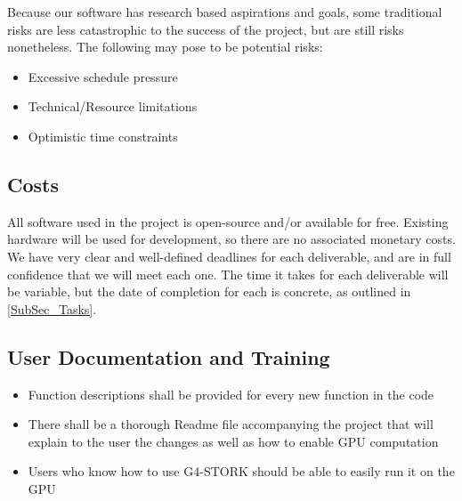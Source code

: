 \documentclass[12pt]{article}
\newcommand{\todo}[1]{\textcolor{red}{[TODO: #1]}} \else
\newcommand{\authornote}[3]{} \newcommand{\todo}[1]{} \fi
\newcommand{\ds}[1]{\authornote{blue}{DS}{#1}} %
\newcommand{\mmp}[1]{\authornote{green}{MP}{#1}}
\begin{document}
Because our software has research based aspirations and goals, some traditional risks are less catastrophic to the success of the project, but are still risks nonetheless. The following may pose to be potential risks:\\

\begin{itemize}
	\item Excessive schedule pressure
	\item Technical/Resource limitations
	\ds{What do you mean by this?}\mmp{commented out the inadequate measurements item}
	\item Optimistic time constraints
\end{itemize}

\subsection{Costs} %
All software used in the project is open-source and/or available for free. Existing hardware will be used for development, so there are no associated monetary costs.\\

We have very clear and well-defined deadlines for each deliverable, and are in full confidence that we will meet each one. The time it takes for each deliverable will be variable, but the date of completion for each is concrete, as outlined in \ref{SubSec_Tasks}.

\subsection{User Documentation and Training} %
\begin{itemize}
	\item Function descriptions shall be provided for every new function in the code
	\item There shall be a thorough Readme file accompanying the project that will explain to the user the changes as well as how to enable GPU computation
	\item Users who know how to use G4-STORK should be able to easily run it on the GPU
\end{itemize}

\end{document}
